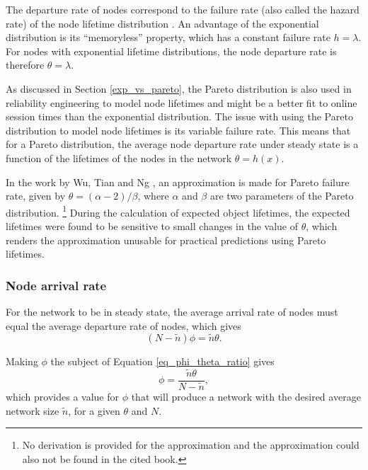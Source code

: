 The departure rate of nodes correspond to the failure rate (also called the hazard rate) of the node lifetime distribution \cite{rausand2004systemreliability}. An advantage of the exponential distribution is its ``memoryless'' property, which has a constant failure rate $h = \lambda$. For nodes with exponential lifetime distributions, the node departure rate is therefore $\theta = \lambda$.

As discussed in Section \ref{exp_vs_pareto}, the Pareto distribution is also used in reliability engineering to model node lifetimes and might be a better fit to online session times than the exponential distribution. The issue with using the Pareto distribution to model node lifetimes is its variable failure rate. This means that for a Pareto distribution, the average node departure rate under steady state is a function of the lifetimes of the nodes in the network $\theta = h(x)$.

In the work by Wu, Tian and Ng \cite{replication_article}, an approximation is made for Pareto failure rate, given by $\theta=(\alpha-2)/\beta$, where $\alpha$ and $\beta$ are two parameters of the Pareto distribution. \footnote{No derivation is provided for the approximation and the approximation could also not be found in the cited book.} During the calculation of expected object lifetimes, the expected lifetimes were found to be sensitive to small changes in the value of $\theta$, which renders the approximation unusable for practical predictions using Pareto lifetimes.

\subsubsection{Node arrival rate}

For the network to be in steady state, the average arrival rate of nodes must equal the average departure rate of nodes, which gives
%
\begin{equation}
    (N - \tilde{n})\phi = \tilde{n}\theta.\label{eq_phi_theta_ratio}
\end{equation}

Making $\phi$ the subject of Equation \eqref{eq_phi_theta_ratio} gives
%
\begin{equation}
    \phi = \frac{\tilde{n}\theta}{N - \tilde{n}},\label{eq_phi}
\end{equation}
%
which provides a value for $\phi$ that will produce a network with the desired average network size $\tilde{n}$, for a given $\theta$ and $N$.

